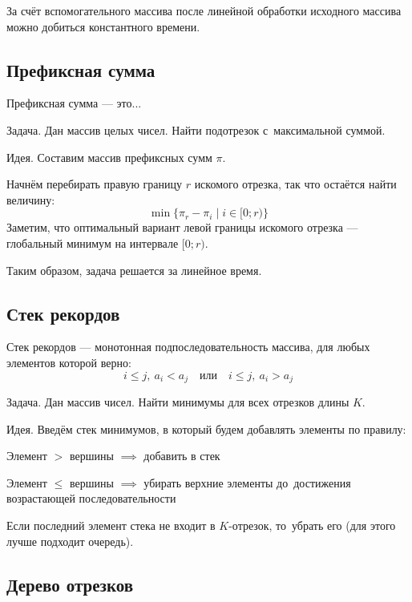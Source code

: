 За счёт вспомогательного массива после линейной обработки исходного массива можно добиться {\ital константного} времени.

\subsection{Префиксная сумма}

{\bold Префиксная сумма} --- это...

\begin{theorem}
{\bold Задача.} Дан массив целых чисел. Найти подотрезок с~максимальной суммой.
\end{theorem}

{\bold Идея.} Составим массив префиксных сумм $\pi$.

Начнём перебирать правую границу $r$ искомого отрезка, так что остаётся найти величину:
$$\min\{\pi_r-\pi_i\mid i\in[0;r)\}$$
Заметим, что оптимальный вариант левой границы искомого отрезка --- {\ital глобальный минимум} на интервале $[0;r)$.

Таким образом, задача решается за {\ital линейное} время.

\subsection{Стек рекордов}

{\bold Стек рекордов} --- монотонная подпоследовательность массива, для любых элементов которой верно:
$$i\leq j,\ a_i\less a_j\quad\text{или}\quad i\leq j,\ a_i\greater a_j$$
\begin{theorem}
{\bold Задача.} Дан массив чисел. Найти минимумы для всех отрезков длины $K$.
\end{theorem}
{\bold Идея.} Введём стек минимумов, в который будем добавлять элементы по правилу:
\begin{list*}[][\#]
\item Элемент $\greater$ вершины $\implies$ добавить в стек
\item Элемент $\leq$ вершины $\implies$ убирать верхние элементы до~достижения возрастающей последовательности
\end{list*}
Если последний элемент стека не входит в $K$-отрезок, то~убрать его {\ital\color{desc}(для этого лучше подходит очередь)}.

\newpage
\subsection{Дерево отрезков}

